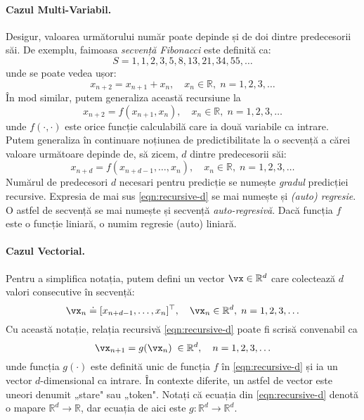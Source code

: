 \documentclass[../../book-main_ro.tex]{subfiles}
\begin{document}
\paragraph{Cazul Multi-Variabil.}
Desigur, valoarea următorului număr poate depinde și de doi dintre predecesorii săi. De exemplu, faimoasa {\em secvență Fibonacci} este definită ca:
\begin{equation}
    {S} = 1, 1, 2, 3, 5, 8, 13, 21, 34, 55, \ldots
\end{equation}
unde se poate vedea ușor:
\begin{equation}
    x_{n+2} = x_{n+1} + x_{n}, \quad  x_n \in \mathbb{R}, \;  n = 1, 2, 3, \ldots
\end{equation}
În mod similar, putem generaliza această recursiune la \begin{equation}
    x_{n+2} = f(x_{n+1}, x_{n}), \quad x_n \in \mathbb{R}, \;  n =  1, 2, 3, \ldots
\end{equation}
unde $f(\cdot,\cdot)$ este orice funcție calculabilă care ia două variabile ca intrare. Putem generaliza în continuare noțiunea de predictibilitate la o secvență a cărei valoare următoare depinde de, să zicem, $d$ dintre predecesorii săi:
\begin{equation}
    x_{n+d} = f(x_{n+d-1}, \ldots,  x_{n}), \quad  x_n \in \mathbb{R}, \; n =  1, 2, 3, \ldots
    \label{eqn:recursive-d}
\end{equation}
Numărul de predecesori $d$ necesari pentru predicție se numește {\em gradul} predicției recursive. Expresia de mai sus \eqref{eqn:recursive-d} se mai numește și {\em (auto) regresie}. O astfel de secvență se mai numește și secvență {\em auto-regresivă}. Dacă funcția $f$ este o funcție liniară, o numim regresie (auto) liniară.

\paragraph{Cazul Vectorial.}
Pentru a simplifica notația, putem defini un vector $\vx \in \mathbb{R}^d$ care colectează $d$ valori consecutive în secvență: \begin{equation}
    \vx_n \doteq [x_{n+d-1}, \ldots,  x_{n}]^\top, \quad \vx_n \in \mathbb{R}^d, \; n = 1, 2, 3, \ldots
\end{equation}
Cu această notație, relația recursivă \eqref{eqn:recursive-d} poate fi scrisă convenabil ca
\begin{equation}
    \vx_{n+1} = g(\vx_{n}) \; \in \mathbb{R}^d, \quad n =  1, 2, 3, \ldots
    \label{eqn:recursive-v}
\end{equation}
unde funcția $g(\cdot)$ este definită unic de funcția $f$ în \eqref{eqn:recursive-d} și ia un vector $d$-dimensional ca intrare. În contexte diferite, un astfel de vector este uneori denumit „stare" sau „token". Notați că ecuația din \eqref{eqn:recursive-d} denotă o mapare $\mathbb{R}^d \rightarrow \mathbb{R}$, dar ecuația de aici este $g: \mathbb{R}^d \rightarrow \mathbb{R}^d$.
\end{document}
